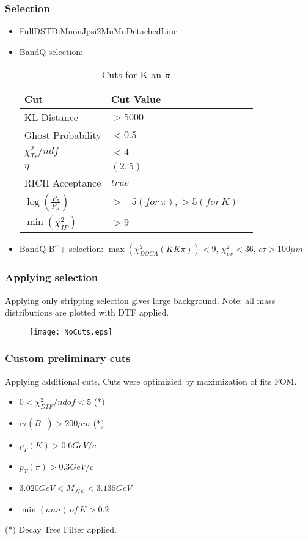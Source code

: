 \documentclass{beamer}
\begin{document}
\begin{frame}
\frametitle{Selection}
\begin{itemize}
\item FullDSTDiMuonJpsi2MuMuDetachedLine
\item BandQ selection:

\begin{table}
\begin{tabular}{l l l}
\toprule
\textbf{Cut} & \textbf{Cut Value} \\
\midrule
KL Distance & $> 5000 $\\
Ghost Probability & $< 0.5 $\\
$\chi^{2}_{Tr} / ndf$ & $< 4 $\\
$\eta$ & $(2, 5) $\\
RICH Acceptance & $ true $\\
$\log(\frac{P_\pi}{P_K})$  & $> -5(for\,\pi), > 5(for\,K) $\\
$\min(\chi^{2}_{IP})$ & $> 9 $\\
\bottomrule
\end{tabular}
\caption{Cuts for K an $\pi$}
\end{table}


\item BandQ B^+ selection: $\max(\chi^{2}_{DOCA}(KK\pi)) < 9$, $\chi^{2}_{vx} < 36$, $c\tau > 100 \mu m$

\end{itemize}
\end{frame}


\begin{frame}
\frametitle{Applying selection}
Applying only stripping selection gives large background. Note: all mass distributions are plotted with DTF applied.

\begin{figure}
\texttt{[image: NoCuts.eps]}
\end{figure}
\end{frame}



\begin{frame}
\frametitle{Custom preliminary cuts}
Applying additional cuts. Cuts were optimizied by maximization of fits FOM.
\begin{itemize}
\item $0 < \chi^{2}_{DTF} / ndof < 5$ (*)
\item $c\tau(B^{+}) > 200 \mu m$ (*)
\item $p_{T}(K) > 0.6 GeV/c$
\item $p_{T}(\pi) > 0.3 GeV/c$
\item $3.020 GeV< M_{J/\psi} < 3.135 GeV$
\item $\min(ann)\,of\,K > 0.2$

\end{itemize}

(*) \- Decay Tree Filter applied.
\end{frame}
\end{document}
